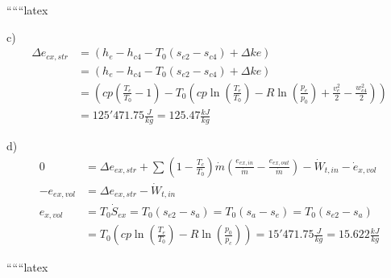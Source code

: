 ``````latex


c) 
\begin{align*}
\Delta e_{cx,str} &= \left( h_e - h_{c4} - T_0(s_{e2} - s_{c4}) + \Delta ke \right) \\
&= \left( h_e - h_{c4} - T_0(s_{e2} - s_{c4}) + \Delta ke \right) \\
&= \left( cp \left( \frac{T_e}{T_0} - 1 \right) - T_0 \left( cp \ln \left( \frac{T_e}{T_0} \right) - R \ln \left( \frac{p_e}{p_0} \right) + \frac{v_e^2}{2} - \frac{w_{c4}^2}{2} \right) \right) \\
&= 125'471.75 \frac{J}{kg} = 125.47 \frac{kJ}{kg}
\end{align*}

d) 
\begin{align*}
0 &= \Delta e_{ex,str} + \sum \left( 1 - \frac{T_c}{T_0} \right) \dot{m} \left( \frac{e_{ex,in}}{\dot{m}} - \frac{e_{ex,out}}{\dot{m}} \right) - \dot{W}_{t,in} - \dot{e}_{x,vol} \\
-e_{ex,vol} &= \Delta e_{ex,str} - \dot{W}_{t,in} \\
e_{x,vol} &= T_0 \dot{S}_{ex} = T_0 \left( s_{e2} - s_{a} \right) = T_0 \left( s_{a} - s_{e} \right) = T_0 \left( s_{e2} - s_{a} \right) \\
&= T_0 \left( cp \ln \left( \frac{T_e}{T_0} \right) - R \ln \left( \frac{p_0}{p_c} \right) \right) = 15'471.75 \frac{J}{kg} = 15.622 \frac{kJ}{kg}
\end{align*}

``````latex


